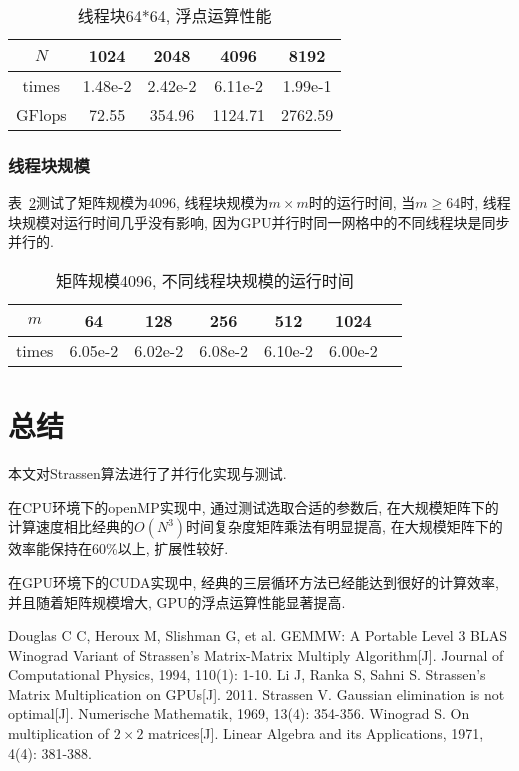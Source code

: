 \documentclass[szjs]{cjcmltx}
\begin{document}
\begin{table}[htbp]\centering\caption{线程块64*64, 浮点运算性能}\label{tab:8}
\begin{tabular}{|c|c|c|c|c|}\hline
$N$ & 1024 & 2048 & 4096 & 8192\\
\hline
times & 1.48e-2 & 2.42e-2 & 6.11e-2 & 1.99e-1\\
\hline
GFlops & 72.55 & 354.96 & 1124.71 & 2762.59\\
\hline
\end{tabular}
\end{table}

\subsubsection{线程块规模}
表~\ref{tab:9}测试了矩阵规模为4096, 线程块规模为$m\times m$时的运行时间, 当$m\geq 64$时, 线程块规模对运行时间几乎没有影响, 因为GPU并行时同一网格中的不同线程块是同步并行的.
\begin{table}[htbp]\centering\caption{矩阵规模4096, 不同线程块规模的运行时间}\label{tab:9}\begin{tabular}{|c|c|c|c|c|c|c|}
\hline
$m$ & 64 & 128 & 256 & 512 & 1024\\
\hline
times & 6.05e-2 & 6.02e-2 & 6.08e-2 & 6.10e-2 & 6.00e-2\\
\hline
\end{tabular}\end{table}

\section{总结}
本文对Strassen算法进行了并行化实现与测试. 

在CPU环境下的openMP实现中, 通过测试选取合适的参数后, 在大规模矩阵下的计算速度相比经典的$O(N^3)$时间复杂度矩阵乘法有明显提高, 在大规模矩阵下的效率能保持在60\%以上, 扩展性较好.

在GPU环境下的CUDA实现中, 经典的三层循环方法已经能达到很好的计算效率, 并且随着矩阵规模增大, GPU的浮点运算性能显著提高.

\begin{thebibliography}{00}
Douglas C C, Heroux M, Slishman G, et al. GEMMW: A Portable Level 3 BLAS Winograd Variant of Strassen's Matrix-Matrix Multiply Algorithm[J]. Journal of Computational Physics, 1994, 110(1): 1-10.
Li J, Ranka S, Sahni S. Strassen's Matrix Multiplication on GPUs[J]. 2011.
Strassen V. Gaussian elimination is not optimal[J]. Numerische Mathematik, 1969, 13(4): 354-356.
Winograd S. On multiplication of $2\times 2$ matrices[J]. Linear Algebra and its Applications, 1971, 4(4): 381-388.
\end{thebibliography}
\end{document}
